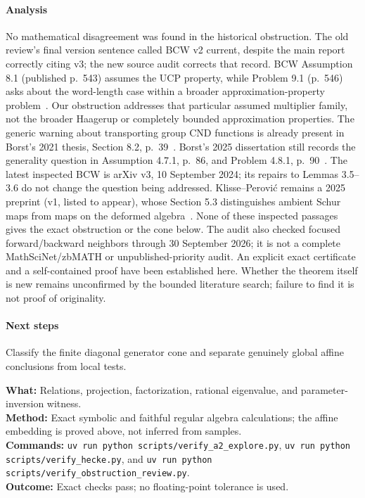 \paragraph{Analysis} No mathematical disagreement was found in the
historical obstruction. The old review's final version sentence called BCW
v2 current, despite the main report correctly citing v3; the new source
audit corrects that record. BCW Assumption 8.1 (published p.~543) assumes
the UCP property, while Problem 9.1 (p.~546) asks about the word-length
case within a broader approximation-property problem~\cite{BorstCaspersWasilewski2024}.
Our obstruction addresses that particular assumed multiplier family, not
the broader Haagerup or completely bounded approximation properties.
The generic warning about transporting group CND functions is already
present in Borst's 2021 thesis, Section 8.2, p.~39~\cite{BorstMSc2021}.
Borst's 2025 dissertation still records the generality question in
Assumption 4.7.1, p.~86, and Problem 4.8.1, p.~90~\cite{BorstPhD2025}.
The latest inspected BCW is arXiv v3, 10 September 2024; its repairs to
Lemmas 3.5--3.6 do not change the question being addressed.
Klisse--Perovi\'c remains a 2025 preprint (v1, listed to appear), whose
Section 5.3 distinguishes ambient Schur maps from maps on the deformed
algebra~\cite{KlissePerovic2025}. None of these inspected passages gives
the exact obstruction or the cone below. The audit also checked focused
forward/backward neighbors through 30 September 2026; it is not a complete
MathSciNet/zbMATH or unpublished-priority audit.
An explicit exact certificate and a self-contained proof have been established
here. Whether the theorem itself is new remains unconfirmed by the bounded
literature search; failure to find it is not proof of originality.
\paragraph{Next steps} Classify the finite diagonal generator cone and
separate genuinely global affine conclusions from local tests.
\begin{verification}
\textbf{What:} Relations, projection, factorization, rational eigenvalue,
and parameter-inversion witness.\\
\textbf{Method:} Exact symbolic and faithful regular algebra calculations;
the affine embedding is proved above, not inferred from samples.\\
\textbf{Commands:} \texttt{uv run python scripts/verify\_a2\_explore.py},
\texttt{uv run python scripts/verify\_hecke.py}, and
\texttt{uv run python scripts/verify\_obstruction\_review.py}.\\
\textbf{Outcome:} Exact checks pass; no floating-point tolerance is used.
\end{verification}

